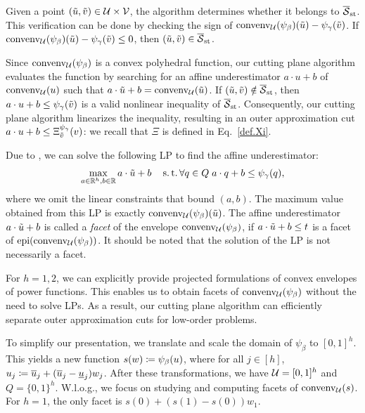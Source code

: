 Given a point $(\tilde{u}, \tilde{v}) \in \mathcal U \times \mathcal V$, the algorithm determines whether it belongs to $\overline{\mathcal S}_{\mathrm{st}}$. This verification can be done by checking the sign of $\operatorname{convenv}_{\mathcal U}(\psi_{\beta})(\tilde{u}) - \psi_{\gamma}(\tilde{v})$.  If $\operatorname{convenv}_{\mathcal U}(\psi_{\beta})(\tilde{u}) - \psi_{\gamma}(\tilde{v}) \le 0$, then $(\tilde{u}, \tilde{v}) \in \overline{\mathcal S}_{\mathrm{st}}$. 

Since $\operatorname{convenv}_{\mathcal U}(\psi_{\beta})$ is a convex polyhedral function, our cutting plane algorithm evaluates the function by searching for an affine underestimator $a \cdot u+b$ of $\operatorname{convenv}_{\mathcal U}(u)$ such that $a \cdot \tilde{u}+b = \operatorname{convenv}_{\mathcal U}(\tilde{u})$. If $ (\tilde{u}, \tilde{v}) \notin \overline{\mathcal S}_{\mathrm{st}}$, then   $a \cdot u+b \le  \psi_{\gamma}(\tilde{v})$ is   a valid nonlinear inequality of $\overline{\mathcal S}_{\mathrm{st}}$. Consequently, our cutting plane algorithm linearizes the inequality, resulting in  an outer approximation cut $a \cdot u+b \le  {\Xi^{\psi_{\gamma}}_{\tilde{v}}}(v)$: we recall that $\Xi$ is defined in Eq.~\eqref{def.Xi}.



 Due to , we can solve the following LP to find the affine underestimator:
\begin{equation}
	\max_{a \in \mathbb R^{h}, b \in \mathbb R} a \cdot \tilde{u}+b \quad \operatorname{s.t.} \forall q \in Q \; a \cdot q+b \le \psi_{\gamma}(q),
\end{equation}
where we omit the linear constraints that  bound $(a,b)$. The maximum value obtained from this LP  is exactly  $\operatorname{convenv}_{\mathcal U}(\psi_{\beta})(\tilde{u})$. The affine underestimator $a \cdot \tilde{u}+b$ is called a \emph{facet} of the envelope $\operatorname{convenv}_{\mathcal U}(\psi_{\beta})$, if $a \cdot \tilde{u}+b \le t $ is a facet of $\operatorname{epi}(\operatorname{convenv}_{\mathcal U}(\psi_{\beta}))$. It should be noted that the solution of the LP is not necessarily a facet.


For $h = 1,2$, we can explicitly provide projected formulations of convex envelopes of power functions. This enables us to obtain facets of $\operatorname{convenv}_{\mathcal U}(\psi_{\beta})$ without the need to solve LPs. As a result, our cutting plane algorithm can efficiently separate outer approximation cuts for low-order problems.

To simplify our presentation, we translate and scale the domain of $\psi_{\beta}$ to $[0,1]^h$. This yields a new function $s(w) \coloneqq \psi_{\beta}(u)$, where for all $j \in [h]$, $u_j \coloneqq \overline{u}_j + (\overline{u}_j - \underline{u}_j)w_j$. After these transformations, we have $\mathcal U = [0,1]^h$ and $Q = \{0,1\}^h$.   W.l.o.g., we focus on studying and computing facets of $\operatorname{convenv}_{\mathcal U}(s)$. For $h = 1$, the only facet is $s(0) + (s(1)- s(0))w_1$. 


